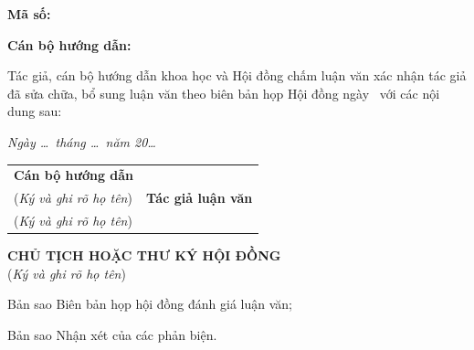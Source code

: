 \documentclass[a4paper,14pt]{extreport}
\begin{document}
\noindent\textbf{Mã số:} \dotfill

\noindent\textbf{Cán bộ hướng dẫn:} \dotfill

\vspace{0.5cm}
\noindent Tác giả, cán bộ hướng dẫn khoa học và Hội đồng chấm luận văn xác nhận tác giả đã sửa chữa, bổ sung luận văn theo biên bản họp Hội đồng ngày \dotfill\ với các nội dung sau:

\noindent\dotfill

\noindent\dotfill

\noindent\dotfill

\vspace{1cm}
\begin{flushright}
    \textit{Ngày \ldots\ tháng \ldots\ năm 20\ldots}
\end{flushright}

\begin{table}[H]
    \centering
    \begin{tabular}{p{7cm}p{7cm}}
        \centering\textbf{Cán bộ hướng dẫn}\\(\textit{Ký và ghi rõ họ tên}) & \centering\textbf{Tác giả luận văn}\\(\textit{Ký và ghi rõ họ tên}) \tabularnewline
    \end{tabular}
\end{table}

\vspace{2cm}
\begin{center}
    \textbf{CHỦ TỊCH HOẶC THƯ KÝ HỘI ĐỒNG}\\
    (\textit{Ký và ghi rõ họ tên})
\end{center}

\vspace{1cm}
\noindent Bản sao Biên bản họp hội đồng đánh giá luận văn;

\noindent Bản sao Nhận xét của các phản biện.
\end{document}

